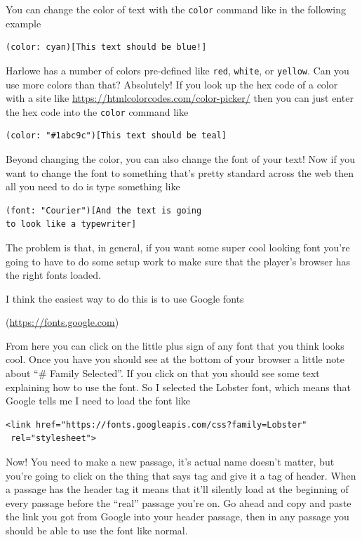 \documentclass[a5paper,11pt]{article}
\begin{document}
You can change the color of text with the \verb"color" command like in the following example
\begin{verbatim}
(color: cyan)[This text should be blue!]
\end{verbatim}

Harlowe has a number of colors pre-defined like \verb"red", \verb"white", or \verb"yellow". Can you use more colors than that? Absolutely! If you look up the hex code of a color with a site like \url{https://htmlcolorcodes.com/color-picker/} then you can just enter the hex code into the \verb"color" command like

\begin{verbatim}
(color: "#1abc9c")[This text should be teal]
\end{verbatim}

Beyond changing the color, you can also change the font of your text! Now if you want to change the font to something that's pretty standard across the web then all you need to do is type something like

\begin{verbatim}
(font: "Courier")[And the text is going
to look like a typewriter]
\end{verbatim}

The problem is that, in general, if you want some super cool looking font you're going to have to do some setup work to make sure that the player's browser has the right fonts loaded.

I think the easiest way to do this is to use Google fonts

(\url{https://fonts.google.com})

From here you can click on the little plus sign of any font that you think looks cool. Once you have you should see at the bottom of your browser a little note about ``\# Family Selected''. If you click on that you should see some text explaining how to use the font. So I selected the Lobster font, which means that Google tells me I need to load the font like
\begin{verbatim}
<link href="https://fonts.googleapis.com/css?family=Lobster" 
 rel="stylesheet">
\end{verbatim}

Now! You need to make a new passage, it's actual name doesn't matter, but you're going to click on the thing that says tag and give it a tag of header. When a passage has the header tag it means that it'll silently load at the beginning of every passage before the ``real'' passage you're on. Go ahead and copy and paste the link you got from Google into your header passage, then in any passage you should be able to use the font like normal.
\end{document}
